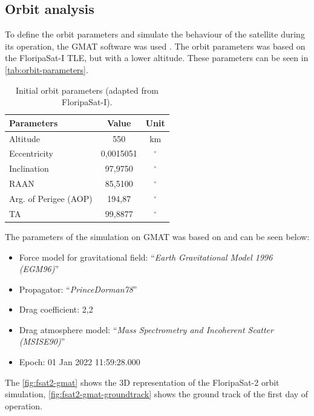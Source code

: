 \subsection{Orbit analysis}

To define the orbit parameters and simulate the behaviour of the satellite during its operation, the GMAT software was used \cite{gmat}. The orbit parameters was based on the FloripaSat-I TLE, but with a lower altitude. These parameters can be seen in \autoref{tab:orbit-parameters}.

\begin{table}[!h]
    \centering
    \begin{tabular}{lcc}
        \toprule[1.5pt]
        \textbf{Parameters} & \textbf{Value} & \textbf{Unit} \\
        \midrule
        Altitude                & 550           & km \\
        Eccentricity            & 0,0015051     & $^{\circ}$ \\
        Inclination             & 97,9750       & $^{\circ}$ \\
        RAAN                    & 85,5100       & $^{\circ}$ \\
        Arg. of Perigee (AOP)   & 194,87        & $^{\circ}$ \\
        TA                      & 99,8877       & $^{\circ}$ \\
        \bottomrule[1.5pt]
    \end{tabular}
    \caption{Initial orbit parameters (adapted from FloripaSat-I).}
    \label{tab:orbit-parameters}
\end{table}

The parameters of the simulation on GMAT was based on \cite{marino2016} and can be seen below:

\begin{itemize}
    \item Force model for gravitational field: ``\textit{Earth Gravitational Model 1996 (EGM96)}''
    \item Propagator: ``\textit{PrinceDorman78}''
    \item Drag coefficient: 2,2
    \item Drag atmosphere model: ``\textit{Mass Spectrometry and Incoherent Scatter (MSISE90)}''
    \item Epoch: 01 Jan 2022 11:59:28.000
\end{itemize}

The \autoref{fig:fsat2-gmat} shows the 3D representation of the FloripaSat-2 orbit simulation, \autoref{fig:fsat2-gmat-groundtrack} shows the ground track of the first day of operation.


